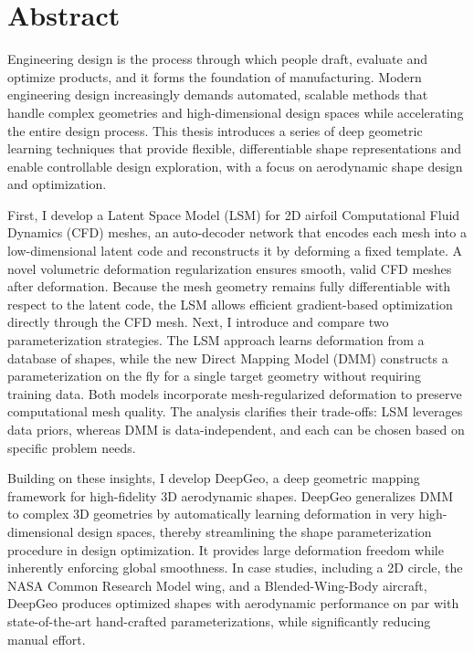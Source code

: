 

\cleardoublepage
\chapter*{Abstract}

Engineering design is the process through which people draft, evaluate and optimize products, and it forms the foundation of manufacturing. Modern engineering design increasingly demands automated, scalable methods that handle complex geometries and high-dimensional design spaces while accelerating the entire design process. This thesis introduces a series of deep geometric learning techniques that provide flexible, differentiable shape representations and enable controllable design exploration, with a focus on aerodynamic shape design and optimization. 

First, I develop a Latent Space Model (LSM) for 2D airfoil Computational Fluid Dynamics (CFD) meshes, an auto-decoder network that encodes each mesh into a low-dimensional latent code and reconstructs it by deforming a fixed template. A novel volumetric deformation regularization ensures smooth, valid CFD meshes after deformation. Because the mesh geometry remains fully differentiable with respect to the latent code, the LSM allows efficient gradient-based optimization directly through the CFD mesh. Next, I introduce and compare two parameterization strategies. The LSM approach learns deformation from a database of shapes, while the new Direct Mapping Model (DMM) constructs a parameterization on the fly for a single target geometry without requiring training data. Both models incorporate mesh-regularized deformation to preserve computational mesh quality. The analysis clarifies their trade-offs: LSM leverages data priors, whereas DMM is data-independent, and each can be chosen based on specific problem needs.

Building on these insights, I develop DeepGeo, a deep geometric mapping framework for high-fidelity 3D aerodynamic shapes. DeepGeo generalizes DMM to complex 3D geometries by automatically learning deformation in very high-dimensional design spaces, thereby streamlining the shape parameterization procedure in design optimization. It provides large deformation freedom while inherently enforcing global smoothness. In case studies, including a 2D circle, the NASA Common Research Model wing, and a Blended-Wing-Body aircraft, DeepGeo produces optimized shapes with aerodynamic performance on par with state-of-the-art hand-crafted parameterizations, while significantly reducing manual effort.

